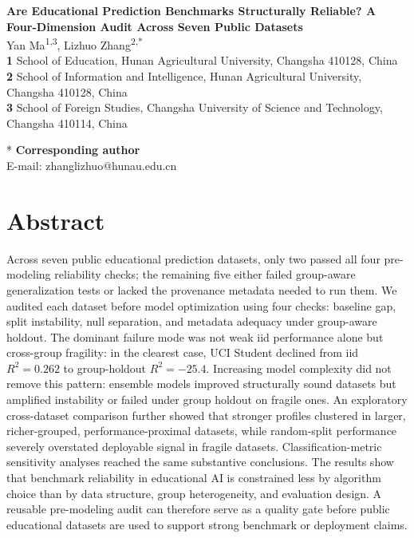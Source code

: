 \documentclass[10pt,letterpaper]{article}
\begin{document}
\vspace*{0.2in}

\begin{flushleft}
{\Large
\textbf{Are Educational Prediction Benchmarks Structurally Reliable?
A Four-Dimension Audit Across Seven Public Datasets}
}
\newline
\\
Yan Ma\textsuperscript{1,3},
Lizhuo Zhang\textsuperscript{2,*}
\\
\bigskip
\textbf{1} School of Education, Hunan Agricultural University,
  Changsha 410128, China \\
\textbf{2} School of Information and Intelligence, Hunan Agricultural University,
  Changsha 410128, China \\
\textbf{3} School of Foreign Studies, Changsha University of Science and Technology,
  Changsha 410114, China \\
\bigskip

* \textbf{Corresponding author}\\
E-mail: zhanglizhuo@hunau.edu.cn
\end{flushleft}

\section*{Abstract}
Across seven public educational prediction datasets, only two passed all four
pre-modeling reliability checks; the remaining five either failed group-aware
generalization tests or lacked the provenance metadata needed to run them. We
audited each dataset before model optimization using four checks: baseline gap,
split instability, null separation, and metadata adequacy under group-aware
holdout. The dominant failure mode was not weak iid performance alone but
cross-group fragility: in the clearest case, UCI Student declined from iid
$R^2 = 0.262$ to group-holdout $R^2 = -25.4$. Increasing model complexity did
not remove this pattern: ensemble models improved structurally sound datasets
but amplified instability or failed under group holdout on fragile ones. An
exploratory cross-dataset comparison further showed that stronger profiles
clustered in larger, richer-grouped, performance-proximal datasets, while
random-split performance severely overstated deployable signal in fragile
datasets. Classification-metric sensitivity analyses reached the same substantive
conclusions. The results show that benchmark reliability in educational AI is
constrained less by algorithm choice than by data structure, group heterogeneity,
and evaluation design. A reusable pre-modeling audit can therefore serve as a
quality gate before public educational datasets are used to support strong
benchmark or deployment claims.
\end{document}

